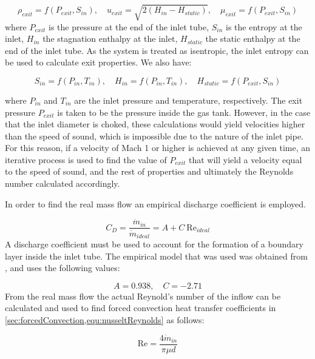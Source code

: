 \begin{equation}
\rho_{exit} =  f\left(P_{exit}, S_{in}\right), \quad u_{exit} = \sqrt{2\left(H_{in} - H_{static}\right)}, \quad\mu_{exit}= f\left(P_{exit}, S_{in}\right)
\end{equation}
where $P_{exit}$ is the pressure at the end of the inlet tube, $S_{in}$ is the entropy at the inlet, $H_{in}$ the stagnation enthalpy at the inlet, $H_{static}$ the static enthalpy at the end of the inlet tube. As the system is treated as isentropic, the inlet entropy can be used to calculate exit properties. We also have:

\begin{equation}
S_{in} = f\left( P_{in}, T_{in} \right), \quad H_{in} = f\left( P_{in}, T_{in} \right), \quad H_{static} = f\left( P_{exit}, S_{in} \right)
\end{equation}

\noindent where $P_{in}$ and $T_{in}$ are the inlet pressure and temperature, respectively. The exit pressure $P_{exit}$ is taken to be the pressure inside the gas tank. However, in the case that the inlet diameter is choked, these calculations would yield velocities higher than the speed of sound, which is impossible due to the nature of the inlet pipe. For this reason, if a velocity of Mach 1 or higher is achieved at any given time, an iterative process is used to find the value of $P_{exit}$ that will yield a velocity equal to the speed of sound, and the rest of properties and ultimately the Reynolds number calculated accordingly.

In order to find the real mass flow an empirical discharge coefficient is employed.

\begin{equation}
C_D = \frac{\dot{m}_{in}}{\dot{m}_{ideal}} = A + C \:\text{Re}_{ideal} 
\end{equation}
A discharge coefficient must be used to account for the formation of a boundary layer inside the inlet tube. The empirical model that was used was obtained from , and uses the following values:

\begin{equation}
A =  0.938 ,  \quad C = -2.71
\end{equation}
From the real mass flow the actual Reynold's number of the inflow can be calculated and used to find forced convection heat transfer coefficients in \cref{sec:forcedConvection,equ:nusseltReynolds} as follows: 

\begin{equation}
\text{Re} = \frac{4\dot m_{in}}{\pi \mu d}
\end{equation}


